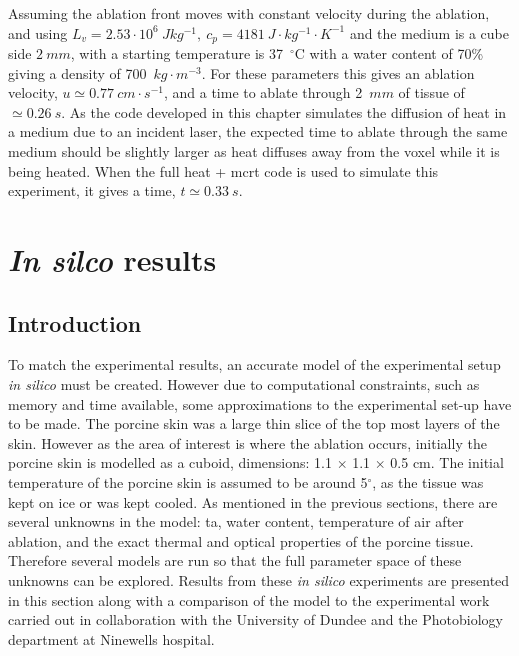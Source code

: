 Assuming the ablation front moves with constant velocity during the ablation, and using $L_v=2.53\cdot 10^6\ J kg^{-1},\ c_p=4181\ J\cdot kg^{-1}\cdot K^{-1}$ and the medium is a cube side $2\ mm$, with a starting temperature is 37~$^{\circ}$C with a water content of 70\% giving a density of 700~$kg\cdot m^{-3}$. For these parameters this gives an ablation velocity, $u\simeq 0.77\ cm\cdot s^{-1}$, and a time to ablate through 2~$mm$ of tissue of $\simeq 0.26~s$.
As the code developed in this chapter simulates the diffusion of heat in a medium due to an incident laser, the expected time to ablate through the same medium should be slightly larger as heat diffuses away from the voxel while it is being heated. When the full heat + \gls*{mcrt} code is used to simulate this experiment, it gives a time, $t \simeq 0.33~s$.	




\section{\textit{In silco} results} 

\subsection{Introduction}

To match the experimental results,  an accurate model of the experimental setup \textit{in silico} must be created. However due to computational constraints, such as memory and time available, some approximations to the experimental set-up have to be made. The porcine skin was a large thin slice of the top most layers of the skin. However as the area of interest is where the ablation occurs, initially the porcine skin is modelled as a cuboid, dimensions:  1.1 $\times$ 1.1 $\times$ 0.5 cm. The initial temperature of the porcine skin is assumed to be around 5$^{\circ}$, as the tissue was kept on ice or was kept cooled. 
As mentioned in the previous sections, there are several unknowns in the model: \gls*{ta}, water content, temperature of air after ablation, and the exact thermal and optical properties of the porcine tissue. Therefore several models are run so that the full parameter space of these unknowns can be explored.
Results from these \textit{in silico} experiments are presented in this section along with a comparison of the model to the experimental work carried out in collaboration with the University of Dundee and the Photobiology department at Ninewells hospital.


